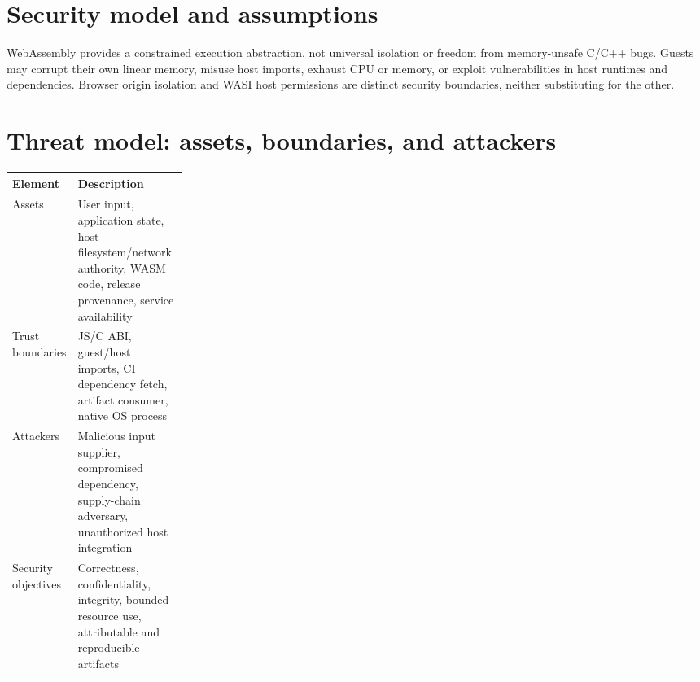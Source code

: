 \documentclass[11pt,letterpaper]{article}
\begin{document}
\frontmatterdoc
\section{Security model and assumptions}
WebAssembly provides a constrained execution abstraction, not universal isolation or freedom from memory-unsafe C/C++ bugs. Guests may corrupt their own linear memory, misuse host imports, exhaust CPU or memory, or exploit vulnerabilities in host runtimes and dependencies. Browser origin isolation and WASI host permissions are distinct security boundaries, neither substituting for the other.

\section{Threat model: assets, boundaries, and attackers}
\noindent\begin{tabularx}{\linewidth}{>{\raggedright\arraybackslash}p{0.25\linewidth}>{\raggedright\arraybackslash}X}
\toprule Element & Description \\ \midrule
Assets & User input, application state, host filesystem/network authority, WASM code, release provenance, service availability \\
Trust boundaries & JS/C ABI, guest/host imports, CI dependency fetch, artifact consumer, native OS process \\
Attackers & Malicious input supplier, compromised dependency, supply-chain adversary, unauthorized host integration \\
Security objectives & Correctness, confidentiality, integrity, bounded resource use, attributable and reproducible artifacts \\
\bottomrule
\end{tabularx}
\end{document}
